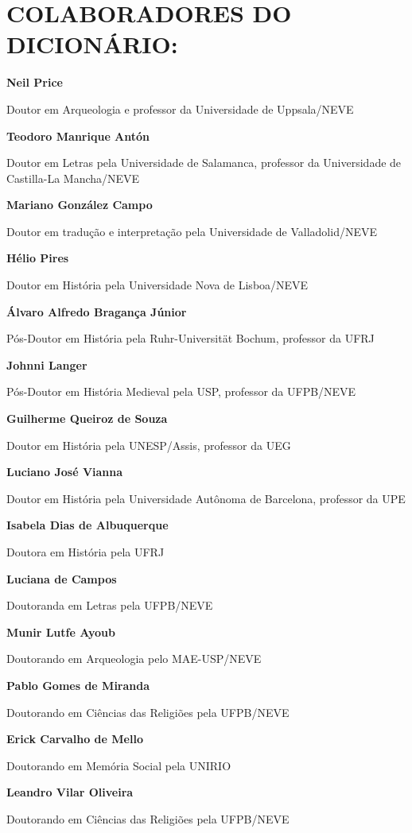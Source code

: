 \section{COLABORADORES DO DICIONÁRIO:}

\textbf{Neil Price}

Doutor em Arqueologia e professor da Universidade de Uppsala/NEVE

\textbf{Teodoro Manrique Antón}

Doutor em Letras pela Universidade de Salamanca, professor da
Universidade de Castilla-La Mancha/NEVE

\textbf{Mariano González Campo}

Doutor em tradução e interpretação pela Universidade de Valladolid/NEVE

\textbf{Hélio Pires}

Doutor em História pela Universidade Nova de Lisboa/NEVE

\textbf{Álvaro Alfredo Bragança Júnior}

Pós-Doutor em História pela Ruhr-Universität Bochum, professor da UFRJ

\textbf{Johnni Langer}

Pós-Doutor em História Medieval pela USP, professor da UFPB/NEVE

\textbf{Guilherme Queiroz de Souza }

Doutor em História pela UNESP/Assis, professor da UEG

\textbf{Luciano José Vianna}

Doutor em História pela Universidade Autônoma de Barcelona, professor da
UPE

\textbf{Isabela Dias de Albuquerque}

Doutora em História pela UFRJ

\textbf{Luciana de Campos}

Doutoranda em Letras pela UFPB/NEVE

\textbf{Munir Lutfe Ayoub}

Doutorando em Arqueologia pelo MAE-USP/NEVE

\textbf{Pablo Gomes de Miranda}

Doutorando em Ciências das Religiões pela UFPB/NEVE

\textbf{Erick Carvalho de Mello}

Doutorando em Memória Social pela UNIRIO

\textbf{Leandro Vilar Oliveira}

Doutorando em Ciências das Religiões pela UFPB/NEVE

